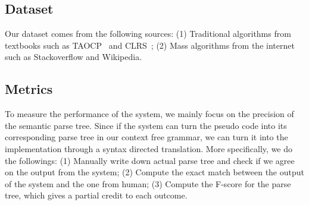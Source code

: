 \documentclass[11pt]{article}
\begin{document}
\subsection{Dataset}

Our dataset comes from the following sources: (1) Traditional algorithms 
from textbooks such as TAOCP~\cite{knuth1998art} and CLRS~\cite{clrs}; (2) Mass algorithms from the internet
 such as Stackoverflow and Wikipedia.  

\subsection{Metrics}
To measure the performance of the system, we mainly focus on the precision of
the semantic parse tree. Since if the system can turn the pseudo code into 
its corresponding parse tree in our context free grammar,  we can turn it into 
the implementation through a syntax directed translation. More specifically,
we do the followings: (1) Manually write down actual parse tree and check if
we agree on the output from the system; (2)  Compute the exact match between
the output of the system and the one from human; (3) Compute the F-score for the
parse tree, which gives a partial credit to each outcome.




\end{document}

